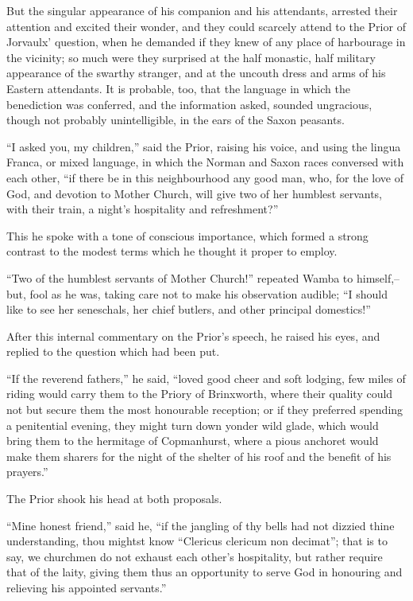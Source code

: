 But the singular appearance of his companion and his attendants,
arrested their attention and excited their wonder, and they could
scarcely attend to the Prior of Jorvaulx' question, when he demanded if
they knew of any place of harbourage in the vicinity; so much were they
surprised at the half monastic, half military appearance of the swarthy
stranger, and at the uncouth dress and arms of his Eastern attendants.
It is probable, too, that the language in which the benediction was
conferred, and the information asked, sounded ungracious, though not
probably unintelligible, in the ears of the Saxon peasants.

``I asked you, my children,'' said the Prior, raising his voice, and
using the lingua Franca, or mixed language, in which the Norman and
Saxon races conversed with each other, ``if there be in this
neighbourhood any good man, who, for the love of God, and devotion to
Mother Church, will give two of her humblest servants, with their train,
a night's hospitality and refreshment?''

This he spoke with a tone of conscious importance, which formed a strong
contrast to the modest terms which he thought it proper to employ.

``Two of the humblest servants of Mother Church!'' repeated Wamba to
himself,--but, fool as he was, taking care not to make his observation
audible; ``I should like to see her seneschals, her chief butlers, and
other principal domestics!''

After this internal commentary on the Prior's speech, he raised his
eyes, and replied to the question which had been put.

``If the reverend fathers,'' he said, ``loved good cheer and soft
lodging, few miles of riding would carry them to the Priory of
Brinxworth, where their quality could not but secure them the most
honourable reception; or if they preferred spending a penitential
evening, they might turn down yonder wild glade, which would bring them
to the hermitage of Copmanhurst, where a pious anchoret would make them
sharers for the night of the shelter of his roof and the benefit of his
prayers.''

The Prior shook his head at both proposals.

``Mine honest friend,'' said he, ``if the jangling of thy bells had not
dizzied thine understanding, thou mightst know ``Clericus clericum non
decimat''; that is to say, we churchmen do not exhaust each other's
hospitality, but rather require that of the laity, giving them thus an
opportunity to serve God in honouring and relieving his appointed
servants.''

